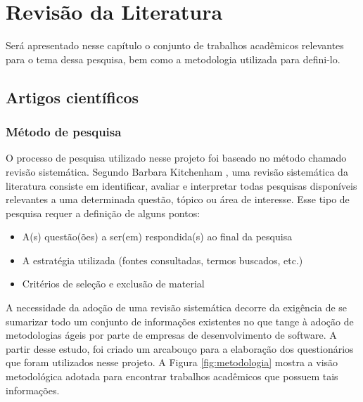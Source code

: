\chapter{Revisão da Literatura}

Será apresentado nesse capítulo o conjunto de trabalhos acadêmicos relevantes para o tema dessa pesquisa, bem como a metodologia utilizada para defini-lo.

\section{Artigos científicos}

\subsection{Método de pesquisa}

O processo de pesquisa utilizado nesse projeto foi baseado no método chamado revisão sistemática. Segundo Barbara Kitchenham \cite{Barbara04}, uma revisão sistemática da literatura consiste em identificar, avaliar e interpretar todas pesquisas disponíveis relevantes a uma determinada questão, tópico ou área de interesse. Esse tipo de pesquisa requer a definição de alguns pontos:

\begin{itemize}
	\item A(s) questão(ões) a ser(em) respondida(s) ao final da pesquisa
	\item A estratégia utilizada (fontes consultadas, termos buscados, etc.)
	\item Critérios de seleção e exclusão de material
\end{itemize}

A necessidade da adoção de uma revisão sistemática decorre da exigência de se sumarizar todo um conjunto de informações existentes no que tange à adoção de metodologias ágeis por parte de empresas de desenvolvimento de software. A partir desse estudo, foi criado um arcabouço para a elaboração dos questionários que foram utilizados nesse projeto. A Figura \ref{fig:metodologia} mostra a visão metodológica adotada para encontrar trabalhos acadêmicos que possuem tais informações.

